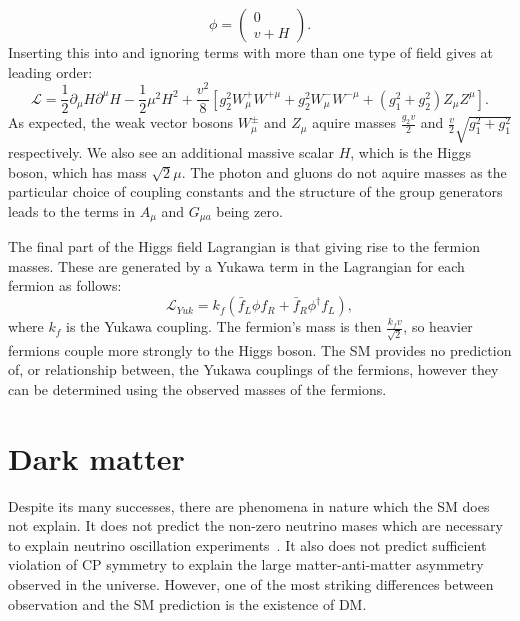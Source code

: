 \begin{equation}
  \phi=\left(\begin{array}{c}0 \\ v+H \end{array}\right).
\end{equation}
Inserting this into  and ignoring terms with more than one type of field gives at leading order:
\begin{equation}
  \mathcal{L}=\frac{1}{2}\partial_{\mu}H\partial^{\mu}H-\frac{1}{2}\mu^{2}H^{2}+\frac{v^{2}}{8}\left[g_{2}^{2}W_{\mu}^{+}W^{+\mu}+g_{2}^{2}W_{\mu}^{-}W^{-\mu}+\left(g_{1}^{2}+g_{2}^{2}\right)Z_{\mu}Z^{\mu}\right].
\end{equation}
As expected, the weak vector bosons $W_{\mu}^{\pm}$ and $Z_{\mu}$ aquire masses $\frac{g_{2}v}{2}$ and $\frac{v}{2}\sqrt{g_{1}^{2}+g_{1}^{2}}$ respectively. We also see an additional massive scalar $H$, which is the Higgs boson, which has mass $\sqrt{2}\mu$. The photon and gluons do not aquire masses as the particular choice of coupling constants and the structure of the group generators leads to the terms in $A_{\mu}$ and $G_{\mu a}$ being zero.

The final part of the Higgs field Lagrangian is that giving rise to the fermion masses. These are generated by a Yukawa term in the Lagrangian for each fermion as follows:
\begin{equation}
  \mathcal{L}_{Yuk}=k_{f}\left(\bar{f}_{L}\phi f_{R}+\bar{f}_{R}\phi^{\dag}f_{L}\right),
\end{equation}
where $k_{f}$ is the Yukawa coupling. The fermion's mass is then $\frac{k_{f}v}{\sqrt{2}}$, so heavier fermions couple more strongly to the Higgs boson. The \ac{SM} provides no prediction of, or relationship between, the Yukawa couplings of the fermions, however they can be determined using the observed masses of the fermions.



\section{Dark matter}
\label{sec:DM}
Despite its many successes, there are phenomena in nature which the \ac{SM} does not explain. It does not predict the non-zero neutrino mases which are necessary to explain neutrino oscillation experiments~\cite{pdg}. It also does not predict sufficient violation of CP symmetry to explain the large matter-anti-matter asymmetry observed in the universe. However, one of the most striking differences between observation and the \ac{SM} prediction is the existence of \ac{DM}.

